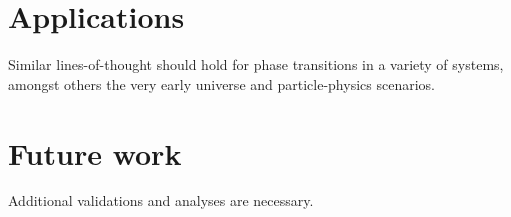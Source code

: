 \section{Applications}
    Similar lines-of-thought should hold for phase transitions in a variety of systems, amongst others the very early universe and particle-physics scenarios. 




\section{Future work}
    Additional validations and analyses are necessary. 

